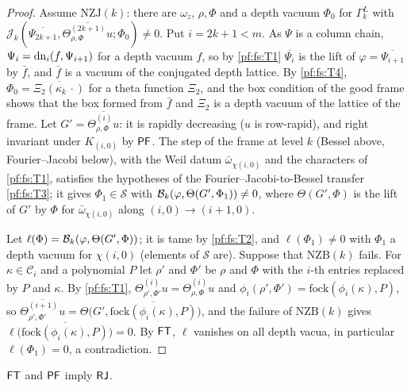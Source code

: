 \begin{proof}
Assume $\mathrm{NZJ}(k)$: there are $\omega_z$, $\rho,\Phi$ and a depth vacuum $\Phi_0$ for $\Gamma^L_k$ with
$\mathcal J_k(\overline{\Psi_{2k+1}},\overline{\Theta^{(2k+1)}_{\rho,\Phi}u};\Phi_0)\ne0$. Put $i=2k+1<m$. As $\Psi$ is a column chain,
$\Psi_i=\mathrm{dn}_i(f,\Psi_{i+1})$ for a depth vacuum $f$, so by \ref{pf:fs:T1} $\overline{\Psi_i}$ is the lift of $\varphi=\overline{\Psi_{i+1}}$ by
$\bar f$, and $\bar f$ is a vacuum of the conjugated depth lattice. By \ref{pf:fs:T4}, $\Phi_0=\overline{\Xi_2(\kappa_k\,\cdot)}$ for a theta
function $\Xi_2$, and the box condition of the good frame shows that the box formed from $\bar f$ and $\Xi_2$ is a depth vacuum of the
lattice of the frame. Let $G'=\overline{\Theta^{(i)}_{\rho,\Phi}u}$: it is rapidly decreasing ($u$ is row-rapid), and right invariant under
$K_{(i,0)}$ by $\mathsf{PF}$. The step of the frame at level $k$ (Bessel above, Fourier--Jacobi below), with the Weil datum
$\bar\omega_{\chi(i,0)}$ and the characters of \ref{pf:fs:T1}, satisfies the hypotheses of the Fourier--Jacobi-to-Bessel transfer
\ref{pf:fs:T3}; it gives $\Phi_1\in\mathcal S$ with $\mathcal B_k(\varphi,\Theta(G',\Phi_1))\ne0$, where $\Theta(G',\Phi)$ is the lift of $G'$ by
$\Phi$ for $\bar\omega_{\chi(i,0)}$ along $(i,0)\to(i+1,0)$.

Let $\ell(\Phi)=\mathcal B_k(\varphi,\Theta(G',\Phi))$; it is tame by \ref{pf:fs:T2}, and $\ell(\Phi_1)\ne0$ with $\Phi_1$ a depth vacuum for
$\chi(i,0)$ (elements of $\mathcal S$ are). Suppose that $\mathrm{NZB}(k)$ fails. For $\kappa\in\mathcal C_i$ and a polynomial $P$ let
$\rho'$ and $\Phi'$ be $\rho$ and $\Phi$ with the $i$-th entries replaced by $P$ and $\kappa$. By \ref{pf:fs:T1},
$\Theta^{(i)}_{\rho',\Phi'}u=\Theta^{(i)}_{\rho,\Phi}u$ and $\phi_i(\rho',\Phi')=\mathrm{fock}(\phi_i(\kappa),P)$, so
$\overline{\Theta^{(i+1)}_{\rho',\Phi'}u}=\Theta\bigl(G',\overline{\mathrm{fock}(\phi_i(\kappa),P)}\bigr)$, and the failure of $\mathrm{NZB}(k)$ gives
$\ell\bigl(\overline{\mathrm{fock}(\phi_i(\kappa),P)}\bigr)=0$. By $\mathsf{FT}$, $\ell$ vanishes on all depth vacua, in particular
$\ell(\Phi_1)=0$, a contradiction.
\end{proof}

\begin{proposition}\label{pf:fs:rungJ}
$\mathsf{FT}$ and $\mathsf{PF}$ imply $\mathsf{RJ}$.
\end{proposition}

